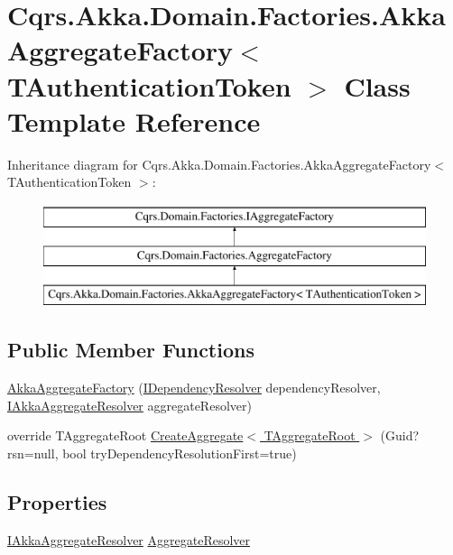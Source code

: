 \hypertarget{classCqrs_1_1Akka_1_1Domain_1_1Factories_1_1AkkaAggregateFactory}{}\section{Cqrs.\+Akka.\+Domain.\+Factories.\+Akka\+Aggregate\+Factory$<$ T\+Authentication\+Token $>$ Class Template Reference}
\label{classCqrs_1_1Akka_1_1Domain_1_1Factories_1_1AkkaAggregateFactory}
Inheritance diagram for Cqrs.\+Akka.\+Domain.\+Factories.\+Akka\+Aggregate\+Factory$<$ T\+Authentication\+Token $>$\+:\begin{figure}[H]
\begin{center}
\leavevmode
\includegraphics[height=3.000000cm]{classCqrs_1_1Akka_1_1Domain_1_1Factories_1_1AkkaAggregateFactory}
\end{center}
\end{figure}
\subsection*{Public Member Functions}
\begin{DoxyCompactItemize}
\item 
\hyperlink{classCqrs_1_1Akka_1_1Domain_1_1Factories_1_1AkkaAggregateFactory_a589acbd624020f419480f28c16e1c03b}{Akka\+Aggregate\+Factory} (\hyperlink{interfaceCqrs_1_1Configuration_1_1IDependencyResolver}{I\+Dependency\+Resolver} dependency\+Resolver, \hyperlink{interfaceCqrs_1_1Akka_1_1Domain_1_1IAkkaAggregateResolver}{I\+Akka\+Aggregate\+Resolver} aggregate\+Resolver)
\item 
override T\+Aggregate\+Root \hyperlink{classCqrs_1_1Akka_1_1Domain_1_1Factories_1_1AkkaAggregateFactory_a41fbe3e0d84a4f9244fcd13058337412}{Create\+Aggregate$<$ T\+Aggregate\+Root $>$} (Guid? rsn=null, bool try\+Dependency\+Resolution\+First=true)
\end{DoxyCompactItemize}
\subsection*{Properties}
\begin{DoxyCompactItemize}
\item 
\hyperlink{interfaceCqrs_1_1Akka_1_1Domain_1_1IAkkaAggregateResolver}{I\+Akka\+Aggregate\+Resolver} \hyperlink{classCqrs_1_1Akka_1_1Domain_1_1Factories_1_1AkkaAggregateFactory_ae83aa4aa5cbe5fe0cc0cea41de002218}{Aggregate\+Resolver}
\end{DoxyCompactItemize}


